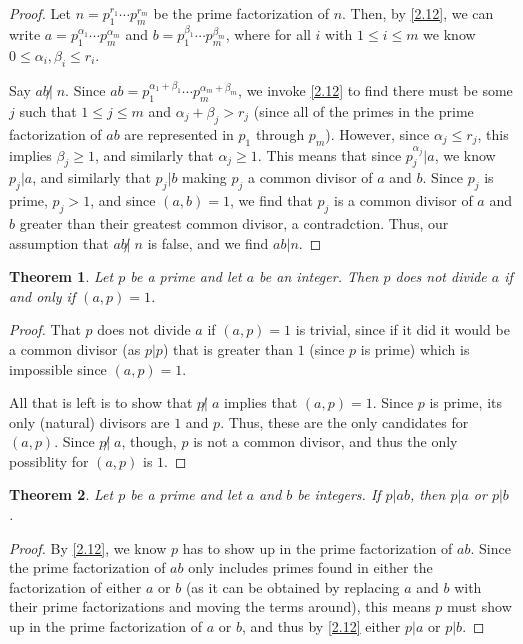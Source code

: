 \documentclass{article}
\newtheorem{thm}{Theorem}[section]
\numberwithin{equation}{thm}
\begin{document}
\begin{proof}
  Let $n = p_1^{r_1} \cdots p_m^{r_m}$ be the prime factorization of $n$. Then, by \ref{2.12}, we can write $a = p_1^{\alpha_1} \cdots p_m^{\alpha_m}$ and $b = p_1^{\beta_1} \cdots p_m^{\beta_m}$, where for all $i$ with $1 \leq i \leq m$ we know $0 \leq \alpha_i, \beta_i \leq r_i$.

  Say $ab \not | \; n$. Since $ab = p_1^{\alpha_1 + \beta_1} \cdots p_m^{\alpha_m + \beta_m}$, we invoke \ref{2.12} to find there must be some $j$ such that $1 \leq j \leq m$ and $\alpha_j + \beta_j > r_j$ (since all of the primes in the prime factorization of $ab$ are represented in $p_1$ through $p_m$). However, since $\alpha_j \leq r_j$, this implies $\beta_j \geq 1$,
  and similarly that $\alpha_j \geq 1$. This means that since $p_j^{\alpha_j} | a$, we know $p_j | a$, and similarly that $p_j | b$ making $p_j$ a common divisor of $a$ and $b$. Since $p_j$ is prime, $p_j > 1$, and since $(a,b) = 1$, we find that $p_j$ is a common divisor of $a$ and $b$ greater than their greatest common divisor, a contradction. Thus, our assumption that $ab \not | \; n$ is false, and we find $ab | n$.
\end{proof}



\begin{thm} \label{2.26}
  Let $p$ be a prime and let $a$ be an integer. Then $p$ does not divide $a$ if and only if $(a, p) = 1$.
\end{thm}

\begin{proof}
  That $p$ does not divide $a$ if $(a, p) = 1$ is trivial, since if it did it would be a common divisor (as $p | p$) that is greater than $1$ (since $p$ is prime) which is impossible since $(a, p) = 1$.

  All that is left is to show that $p \not | \; a$ implies that $(a, p) = 1$. Since $p$ is prime, its only (natural) divisors are $1$ and $p$. Thus, these are the only candidates for $(a, p)$. Since $p \not | \; a$, though, $p$ is not a common divisor, and thus the only possiblity for $(a, p)$ is $1$.
\end{proof}



\begin{thm} \label{2.27}
  Let $p$ be a prime and let $a$ and $b$ be integers. If $p | ab$, then $p | a$ or $p | b$.
\end{thm}

\begin{proof}
  By \ref{2.12}, we know $p$ has to show up in the prime factorization of $ab$. Since the prime factorization of $ab$ only includes primes found in either the factorization of either $a$ or $b$ (as it can be obtained by replacing $a$ and $b$ with their prime factorizations and moving the terms around), this means $p$ must show up in the prime factorization of $a$ or $b$, and thus by \ref{2.12} either $p | a$ or $p | b$.
\end{proof}
\end{document}
